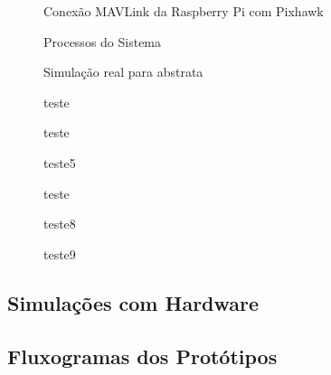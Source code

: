 \begin{figure}[htpb]
	\centering
	\caption{Conexão MAVLink da Raspberry Pi com Pixhawk}
	\fontsize{9pt}{12pt}\selectfont
	\def\svgwidth{15cm}
	
	\label{fig:mavlink}
\end{figure}

\begin{figure}[htpb]
	\centering
	\caption{Processos do Sistema}
	\fontsize{9pt}{12pt}\selectfont
	\def\svgwidth{15cm}
	
	\label{fig:pross}
\end{figure}

\begin{figure}[htpb]
	\centering
	\caption{Simulação real para abstrata}
	\fontsize{9pt}{12pt}\selectfont
	\def\svgwidth{15cm}
	
	\label{fig:simul}
\end{figure}
\begin{figure}
	\caption{teste}
	
\label{fig:teste5}
\end{figure}

\begin{figure}
	\caption{teste}
	
	\label{fig:teste6}
\end{figure}

\begin{figure}[htpb]
	\centering
	\caption{teste5}
	\fontsize{9pt}{12pt}\selectfont
	\def\svgwidth{18cm}
	
	\label{fig:teste57}
\end{figure}
\begin{figure}
	\caption{teste}
	
	\label{fig:teste7}
\end{figure}%




\begin{figure}
	\caption{teste8}
	
	\label{fig:teste8}
\end{figure}

\begin{figure}
	\caption{teste9}
	
	\label{fig:teste9}
\end{figure}
\subsection{Simulações com Hardware}



\subsection{Fluxogramas dos Protótipos}

